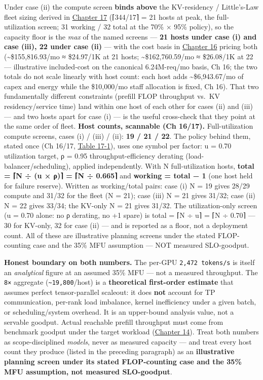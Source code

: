 Under case (ii) the compute screen \textbf{binds above} the KV-residency
/ Little's-Law fleet sizing derived in \hyperref[chap:17]{Chapter 17} (⌈344/17⌉ = 21 hosts
at peak, the full-utilization screen; 31 working / 32 total at the 70\%
× 95\% policy), so the capacity floor is the \emph{max} of the named
screens --- \textbf{21 hosts under case (i) and case (iii), 22 under
case (ii)} --- with the cost basis in \hyperref[chap:16]{Chapter 16} pricing both
(\textasciitilde\$155,816.93/mo ≈ \$24.97/1K at 21 hosts;
\textasciitilde\$162,760.59/mo ≈ \$26.08/1K at 22 --- illustrative
included-cost on the canonical 6.24M-req/mo basis, Ch 16; the two totals
do not scale linearly with host count: each host adds
\textasciitilde\$6,943.67/mo of capex and energy while the \$10,000/mo
staff allocation is fixed, Ch 16). That two fundamentally different
constraints (prefill FLOP throughput vs.~KV residency/service time) land
within one host of each other for cases (ii) and (iii) --- and two hosts
apart for case (i) --- is the useful cross-check that they point at the
same order of fleet. \textbf{Host counts, scannable (Ch 16/17).}
Full-utilization compute screens, cases (i) / (iii) / (ii): \textbf{19 /
21 / 22}. The policy behind them, stated once (Ch 16/17, \hyperref[tab:17.1]{Table 17-1}),
uses one symbol per factor: u = 0.70 utilization target, ρ = 0.95
throughput-efficiency derating (load-balancer/scheduling), applied
independently. With N full-utilization hosts, \textbf{total = ⌈N ÷ (u ×
ρ)⌉ = ⌈N ÷ 0.665⌉} and \textbf{working = total − 1} (one host held for
failure reserve). Written as working/total pairs: case (i) N = 19 gives
28/29 compute and 31/32 for the fleet (N = 21); case (iii) N = 21 gives
31/32; case (ii) N = 22 gives 33/34; the KV-only N = 21 gives 31/32. The
utilization-only screen (u = 0.70 alone: no ρ derating, no +1 spare) is
total = ⌈N ÷ u⌉ = ⌈N ÷ 0.70⌉ --- 30 for KV-only, 32 for case (ii) ---
and is reported as a floor, not a deployment count. All of these are
illustrative planning screens under the stated FLOP-counting case and
the 35\% MFU assumption --- NOT measured SLO-goodput.

\textbf{Honest boundary on both numbers.} The per-GPU
\texttt{2,472\ tokens/s} is itself an \emph{analytical} figure at an
assumed 35\% MFU --- not a measured throughput. The \texttt{8×}
aggregate (\texttt{\textasciitilde{}19,800}/host) is a
\textbf{theoretical first-order estimate} that assumes perfect
tensor-parallel scaleout: it does \textbf{not} account for TP
communication, per-rank load imbalance, kernel inefficiency under a
given batch, or scheduling/system overhead. It is an upper-bound
analysis value, not a servable goodput. Actual reachable prefill
throughput must come from benchmark goodput under the target workload
(\hyperref[chap:14]{Chapter 14}). Treat both numbers as scope-disciplined \emph{models},
never as measured capacity --- and treat every host count they produce
(listed in the preceding paragraph) as an \textbf{illustrative planning
screen under its stated FLOP-counting case and the 35\% MFU assumption,
not measured SLO-goodput}.

